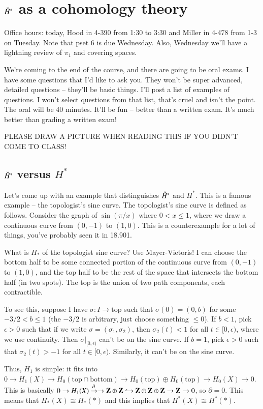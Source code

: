 \section{$\check{H}^\ast$ as a cohomology theory}
Office hours: today, Hood in 4-390 from 1:30 to 3:30 and Miller in 4-478 from 1-3 on Tuesday. Note that pset 6 is due Wednesday. Also, Wednesday we'll have a lightning review of $\pi_1$ and covering spaces.

We're coming to the end of the course, and there are going to be oral exams. I have some questions that I'd like to ask you. They won't be super advanced, detailed questions -- they'll be basic things. I'll post a list of examples of questions. I won't select questions from that list, that's cruel and isn't the point. The oral will be 40 minutes. It'll be fun -- better than a written exam. It's much better than grading a written exam!

PLEASE DRAW A PICTURE WHEN READING THIS IF YOU DIDN'T COME TO CLASS!
\subsection{$\check{H}^\ast$ versus $H^\ast$}
Let's come up with an example that distinguishes $\check{H}^\ast$ and $H^\ast$. This is a famous example -- the topologist's sine curve. The topologist's sine curve is defined as follows. Consider the graph of $\sin(\pi/x)$ where $0<x\leq 1$, where we draw a continuous curve from $(0,-1)$ to $(1,0)$. This is a counterexample for a lot of things, you've probably seen it in 18.901.

What is $H_\ast$ of the topologist sine curve? Use Mayer-Vietoris! I can choose the bottom half to be some connected portion of the continuous curve from $(0,-1)$ to $(1,0)$, and the top half to be the rest of the space that intersects the bottom half (in two spots). The top is the union of two path components, each contractible.

To see this, suppose I have $\sigma:I\to\mathrm{top}$ such that $\sigma(0)=(0,b)$ for some $-3/2 < b\leq 1$ (the $-3/2$ is arbitrary, just choose something $\leq 0$). If $b<1$, pick $\epsilon>0$ such that if we write $\sigma=(\sigma_1,\sigma_2)$, then $\sigma_2(t)<1$ for all $t\in[0,\epsilon)$, where we use continuity. Then $\sigma|_{[0,\epsilon)}$ can't be on the sine curve. If $b=1$, pick $\epsilon>0$ such that $\sigma_2(t)>-1$ for all $t\in[0,\epsilon)$. Similarly, it can't be on the sine curve.

Thus, $H_1$ is simple: it fits into $0\to H_1(X)\to H_0(\mathrm{top}\cap\mathrm{bottom})\to H_0(\mathrm{top})\oplus H_0(\mathrm{top})\to H_0(X)\to 0$. This is basically $0\to H_1(X)\xrightarrow{\partial}\to\mathbf Z\oplus\mathbf Z\hookrightarrow\mathbf Z\oplus\mathbf Z\oplus\mathbf Z\to\mathbf Z\to 0$, so $\partial=0$. This means that $H_\ast(X)\cong H_\ast(\ast)$ and this implies that $H^\ast(X)\cong H^\ast(\ast)$.

